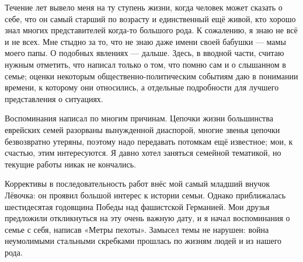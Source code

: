 \label{1-1}
Течение лет вывело меня на ту ступень жизни, когда человек может сказать о себе, что он самый старший по возрасту и единственный ещё живой, кто хорошо знал многих представителей когда-то большого рода. К сожалению, я знаю не всё и не всех. Мне стыдно за то, что не знаю даже имени своей бабушки — мамы моего папы. О подобных явлениях — дальше. Здесь, в вводной части, считаю нужным отметить, что написал только о том, что помню сам и о слышанном в семье; оценки некоторым общественно-политическим событиям даю в понимании времени, к которому они относились, а отдельные подробности для лучшего представления о ситуациях.

\label{1-2}
Воспоминания написал по многим причинам. Цепочки жизни большинства еврейских семей разорваны вынужденной диаспорой, многие звенья цепочки безвозвратно утеряны, поэтому надо передавать потомкам ещё известное; мои, к счастью, этим интересуются. Я давно хотел заняться семейной тематикой, но текущие работы никак не кончались.

\label{2-1}
Коррективы в последовательность работ внёс мой самый младший внучок Лёвочка: он проявил большой интерес к истории семьи. Однако приближалась шестидесятая годовщина Победы над фашистской Германией. Мои друзья предложили откликнуться на эту очень важную дату, и я начал воспоминания о семье с себя, написав «Метры пехоты». Замысел темы не нарушен: война неумолимыми стальными скребками прошлась по жизням людей и из нашего рода.

